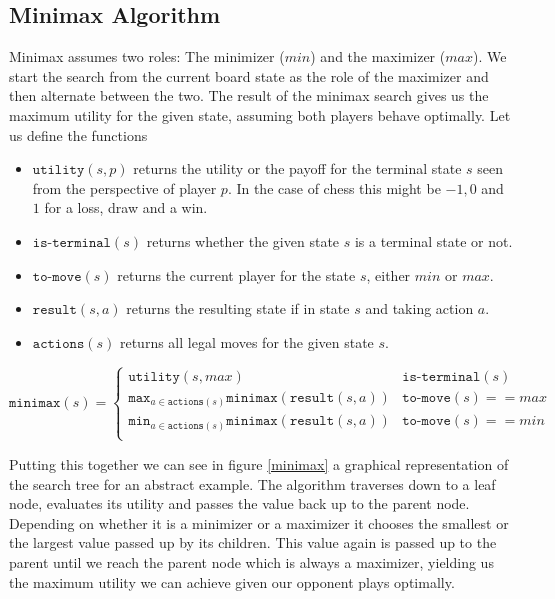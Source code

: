 \subsection{Minimax Algorithm}
Minimax assumes two roles: The minimizer ($min$) and the maximizer ($max$). We start the search from the current board state as the role of the maximizer and then alternate between the two. The result of the minimax search gives us the maximum utility for the given state, assuming both players behave optimally. Let us define the functions \cite[p. 303f.]{russell_artificial_2021}
\begin{itemize}
    \item $\texttt{utility}(s, p)$ returns the utility or the payoff for the terminal state $s$ seen from the perspective of player $p$. In the case of chess this might be $-1, 0$ and $1$ for a loss, draw and a win.
    \item $\texttt{is-terminal}(s)$ returns whether the given state $s$ is a terminal state or not.
    \item $\texttt{to-move}(s)$ returns the current player for the state $s$, either $min$ or $max$.
    \item $\texttt{result}(s, a)$ returns the resulting state if in state $s$ and taking action $a$.
    \item $\texttt{actions}(s)$ returns all legal moves for the given state $s$.
\end{itemize}

\begin{equation}
    \texttt{minimax}(s) =
    \begin{cases}
        \texttt{utility}(s, max)                                                      & \texttt{is-terminal}(s)    \\
        \texttt{max}_{a\in\texttt{actions}(s)}\texttt{minimax}(\texttt{result}(s, a)) & \texttt{to-move}(s) == max \\
        \texttt{min}_{a\in\texttt{actions}(s)}\texttt{minimax}(\texttt{result}(s, a)) & \texttt{to-move}(s) == min \\
    \end{cases}
\end{equation}

Putting this together we can see in figure \ref{minimax} a graphical representation of the search tree for an abstract example. The algorithm traverses down to a leaf node, evaluates its utility and passes the value back up to the parent node. Depending on whether it is a minimizer or a maximizer it chooses the smallest or the largest value passed up by its children. This value again is passed up to the parent until we reach the parent node which is always a maximizer, yielding us the maximum utility we can achieve given our opponent plays optimally.

